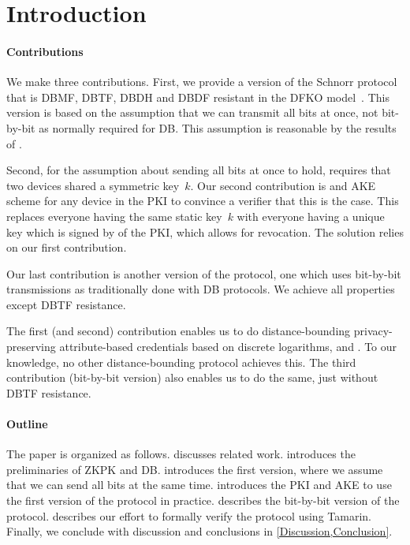 \section{Introduction}%
\label{Introduction}

\paragraph*{Contributions}

We make three contributions.
First, we provide a version of the Schnorr protocol that is \ac{DBMF}, 
\ac{DBTF}, \ac{DBDH} and \ac{DBDF} resistant in the DFKO 
model~\cite{DB-DFKO,FormalTerroristFraud,TREAD}.
This version is based on the assumption that we can transmit all bits at once, 
not bit-by-bit as normally required for \ac{DB}.
This assumption is reasonable by the results of \textcite{UWBPR}.

Second, for the assumption about sending all bits at once to hold, 
\textcite{UWBPR} requires that two devices shared a symmetric key~\(k\).
Our second contribution is  and \ac{AKE} scheme for any device in 
the \ac{PKI} to convince a verifier that this is the case.
This replaces everyone having the same static key~\(k\) with everyone having a 
unique key which is signed by  of the \ac{PKI}, which allows for 
revocation.
The solution relies on our first contribution.

Our last contribution is another version of the protocol, one which uses 
bit-by-bit transmissions as traditionally done with \ac{DB} protocols.
We achieve all properties except \ac{DBTF} resistance.

The first (and second) contribution enables us to do distance-bounding 
privacy-preserving attribute-based credentials based on discrete logarithms, 
\eg \cite{Camenisch-phdthesis} and \cite{CLsignatures}.
To our knowledge, no other distance-bounding protocol achieves this.
The third contribution (bit-by-bit version) also enables us to do the same, 
just without \ac{DBTF} resistance.

\paragraph*{Outline}

The paper is organized as follows.  discusses related work.
 introduces the preliminaries of \ac{ZKPK} and \ac{DB}.
 introduces the first version, where we assume that we can 
send all bits at the same time.
 introduces the \ac{PKI} and \ac{AKE} to use the first 
version of the protocol in practice.
 describes the bit-by-bit version of the protocol.
 describes our effort to formally verify the protocol 
using Tamarin.
Finally, we conclude with discussion and conclusions in 
\cref{Discussion,Conclusion}.
